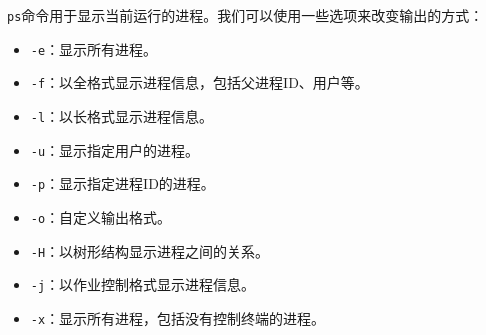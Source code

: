 \documentclass[../main.tex]{subfiles}
\begin{document}
\texttt{ps}命令用于显示当前运行的进程。我们可以使用一些选项来改变输出的方式：
\begin{itemize}
    \item \texttt{-e}：显示所有进程。
    \item \texttt{-f}：以全格式显示进程信息，包括父进程ID、用户等。
    \item \texttt{-l}：以长格式显示进程信息。
    \item \texttt{-u}：显示指定用户的进程。
    \item \texttt{-p}：显示指定进程ID的进程。
    \item \texttt{-o}：自定义输出格式。
    \item \texttt{-H}：以树形结构显示进程之间的关系。
    \item \texttt{-j}：以作业控制格式显示进程信息。
    \item \texttt{-x}：显示所有进程，包括没有控制终端的进程。
\end{itemize}
\end{document}
